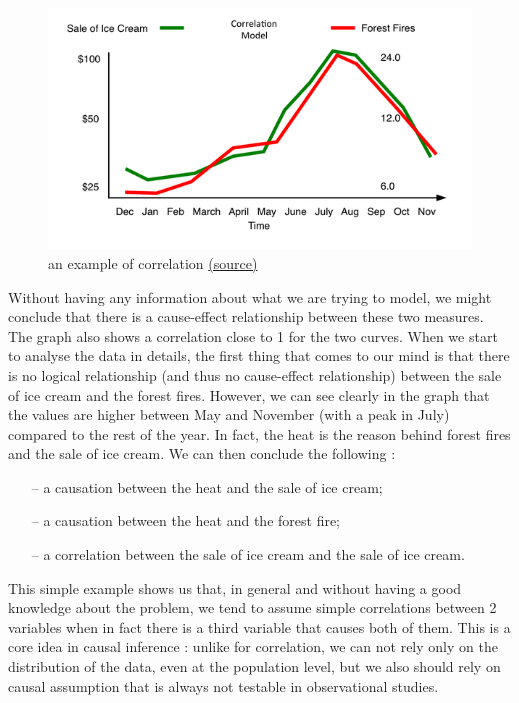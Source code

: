 \documentclass{article}
\begin{document}
\begin{figure}[h]
\centering
\includegraphics[width=0.6 \textwidth]{../figures/corr_caus.png}
\caption{an example of correlation \href{https://www.decisionskills.com/blog/how-ice-cream-kills-understanding-cause-and-effect}{(source)}}
\end{figure}

Without having any information about what we are trying to model, we might conclude that there is a cause-effect relationship between these two measures. The graph also shows a correlation close to 1 for the two curves. When we start to analyse the data in details, the first thing that comes to our mind is that there is no logical relationship (and thus no cause-effect relationship) between the sale of ice cream and the forest fires. However, we can see clearly in the graph that the values are higher between May and November (with a peak in July) compared to the rest of the year. In fact, the heat is the reason behind forest fires and the sale of ice cream. We can then conclude the following : 

\begin{itemize}
\item[--] a causation between the heat and the sale of ice cream;
\item[--] a causation between the heat and the forest fire;
\item[--] a correlation between the sale of ice cream and the sale of ice cream.
\end{itemize}

This simple example shows us that, in general and without having a good knowledge about the problem, we tend to assume simple correlations between 2 variables when in fact there is a third variable that causes both of them. This is a core idea in causal inference : unlike for correlation, we can not rely only on the distribution of the data, even at the population level, but we also should rely on causal assumption that is always not testable in observational studies.\cite{pearl2010mathematics} 
\end{document}

